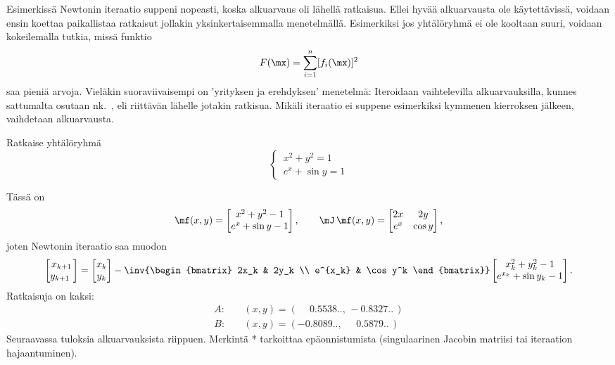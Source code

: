 Esimerkissä Newtonin iteraatio suppeni nopeasti, koska alkuarvaus oli lähellä ratkaisua. Ellei
hyvää alkuarvausta ole käytettävissä, voidaan ensin koettaa paikallistaa ratkaisut jollakin 
yksinkertaisemmalla menetelmällä. Esimerkiksi jos yhtälöryhmä ei ole kooltaan suuri, voidaan 
kokeilemalla tutkia, missä funktio
\[
F(\mx)=\sum_{i=1}^n [f_i(\mx)]^2
\]
saa pieniä arvoja. Vieläkin suoraviivaisempi on 'yrityksen ja erehdyksen' menetelmä: Iteroidaan
%
vaihtelevilla alkuarvauksilla, kunnes sattumalta osutaan nk.\ , eli 
riittävän lähelle jotakin ratkisua. Mikäli iteraatio ei suppene esimerkiksi kymmenen kierroksen
jälkeen, vaihdetaan alkuarvausta.
\begin{Exa}
Ratkaise yhtälöryhmä
\[
\begin{cases}
\,x^2+y^2= 1 \\ \,e^x+\sin y=1
\end{cases}
\]
\end{Exa}
\ratk Tässä on
\[
\mf(x,y) = \begin{bmatrix} x^2+y^2-1 \\ e^x+\sin y-1 \end{bmatrix}, \qquad
\mJ\,\mf(x,y) = \begin{bmatrix} 2x & 2y \\ e^x & \cos y \end{bmatrix},
\]
joten Newtonin iteraatio saa muodon
\[
\begin{bmatrix} x_{k+1} \\ y_{k+1} \end{bmatrix} =
\begin{bmatrix} x_k \\ y_k \end{bmatrix} - 
\inv{\begin{bmatrix} 2x_k & 2y_k \\ e^{x_k} & \cos y^k \end{bmatrix}}
\begin{bmatrix} x_k^2+y_k^2-1 \\ e^{x_k}+\sin y_k-1\end{bmatrix}.
\]
Ratkaisuja on kaksi:
\begin{align*}
A:\quad &(x,y)=(\phantom{-}0.5538..,\, -0.8327..\,) \\
B:\quad &(x,y)=(-0.8089..,\phantom{-}\,0.5879..\,)
\end{align*}
Seuraavassa tuloksia alkuarvauksista riippuen. Merkintä * tarkoittaa epäonnistumista 
(singulaarinen Jacobin matriisi tai iteraation hajaantuminen).
